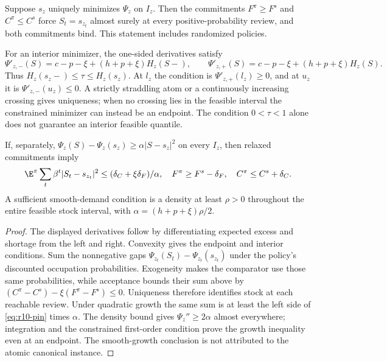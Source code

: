 \begin{proposition}\label{prop:r10-stock}
Suppose $s_z$ uniquely minimizes $\Psi_z$ on $I_z$. Then the commitments $F^\pi\geq F^s$ and $C^\pi\leq C^s$ force $S_t=s_{z_t}$ almost surely at every positive-probability review, and both commitments bind. This statement includes randomized policies.

For an interior minimizer, the one-sided derivatives satisfy
\[
 \Psi'_{z,-}(S)=c-p-\xi+(h+p+\xi)H_z(S-),\qquad
 \Psi'_{z,+}(S)=c-p-\xi+(h+p+\xi)H_z(S).
\]
Thus $H_z(s_z-)\leq\tau\leq H_z(s_z)$. At $l_z$ the condition is $\Psi'_{z,+}(l_z)\geq0$, and at $u_z$ it is $\Psi'_{z,-}(u_z)\leq0$. A strictly straddling atom or a continuously increasing crossing gives uniqueness; when no crossing lies in the feasible interval the constrained minimizer can instead be an endpoint. The condition $0<\tau<1$ alone does not guarantee an interior feasible quantile.

If, separately, $\Psi_z(S)-\Psi_z(s_z)\geq\alpha|S-s_z|^2$ on every $I_z$, then relaxed commitments imply
\begin{equation}\label{eq:r10-pin}
 \E^\pi\sum_t\beta^t|S_t-s_{z_t}|^2
 \leq(\delta_C+\xi\delta_F)/\alpha,
 \quad F^\pi\geq F^s-\delta_F,\quad C^\pi\leq C^s+\delta_C.
\end{equation}
A sufficient smooth-demand condition is a density at least $\rho>0$ throughout the entire feasible stock interval, with $\alpha=(h+p+\xi)\rho/2$.
\end{proposition}
\begin{proof}
The displayed derivatives follow by differentiating expected excess and shortage from the left and right. Convexity gives the endpoint and interior conditions. Sum the nonnegative gaps $\Psi_{z_t}(S_t)-\Psi_{z_t}(s_{z_t})$ under the policy's discounted occupation probabilities. Exogeneity makes the comparator use those same probabilities, while acceptance bounds their sum above by $(C^\pi-C^s)-\xi(F^\pi-F^s)\leq0$. Uniqueness therefore identifies stock at each reachable review. Under quadratic growth the same sum is at least the left side of \eqref{eq:r10-pin} times $\alpha$. The density bound gives $\Psi_z''\geq2\alpha$ almost everywhere; integration and the constrained first-order condition prove the growth inequality even at an endpoint. The smooth-growth conclusion is not attributed to the atomic canonical instance.
\end{proof}

